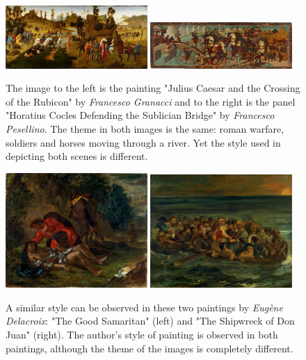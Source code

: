 \documentclass[11pt,a4paper,twoside,openright]{report}
\begin{document}
\begin{figure}[tb]  %
\centering
\includegraphics[width=0.48\textwidth]{diff_caesar}
\includegraphics[width=0.48\textwidth]{diff_horatius}
\caption[Example of different styles]{The image to the left is the painting
"Julius Caesar and the Crossing of the Rubicon" by \emph{Francesco Granacci}
and to the right is the panel "Horatius Cocles Defending the Sublician Bridge"
by \emph{Francesco Pesellino}.  The theme in both images is the same: roman
warfare, soldiers and horses moving through a river.  Yet the style used in
depicting both scenes is different.}
\label{fig:diff}
\end{figure}

\begin{figure}[tb]
\centering
\includegraphics[width=0.48\textwidth]{sim_delacroix_samaritan}
\includegraphics[width=0.48\textwidth]{sim_delacroix_shipwreck}
\caption[Example of similar styles]{A similar style can be observed in these
two paintings by \emph{Eug\`ene Delacroix}: "The Good Samaritan" (left) and
"The Shipwreck of Don Juan" (right).  The author's style of painting is
observed in both paintings, although the theme of the images is completely
different.}
\label{fig:similar}
\end{figure}
\end{document}
